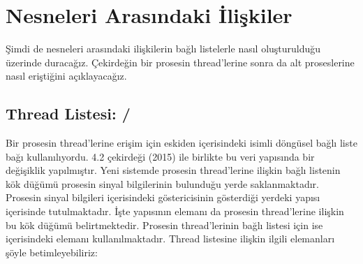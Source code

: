 \documentclass[a4paper,10pt,turkish]{sphinxmanual}
\begin{document}
\section{ Nesneleri Arasındaki İlişkiler}
\label{\detokenize{processcontrolblock:task-struct-nesneleri-arasindaki-iliskiler}}
\sphinxAtStartPar
Şimdi de  nesneleri arasındaki ilişkilerin bağlı listelerle nasıl oluşturulduğu üzerinde
duracağız. Çekirdeğin bir prosesin thread’lerine sonra da alt proseslerine nasıl eriştiğini açıklayacağız.


\subsection{Thread Listesi:  / }
\label{\detokenize{processcontrolblock:thread-listesi-thread-head-thread-node}}
\sphinxAtStartPar
Bir prosesin thread’lerine erişim için eskiden  içerisindeki  isimli
döngüsel bağlı liste bağı kullanılıyordu. 4.2 çekirdeği (2015) ile birlikte bu veri yapısında bir
değişiklik yapılmıştır. Yeni sistemde prosesin thread’lerine ilişkin bağlı listenin kök düğümü prosesin
sinyal bilgilerinin bulunduğu yerde saklanmaktadır. Prosesin sinyal bilgileri  içerisindeki
 göstericisinin gösterdiği yerdeki  yapısı içerisinde tutulmaktadır. İşte
 yapısının  elemanı da prosesin thread’lerine ilişkin bu kök düğümü
belirtmektedir. Prosesin thread’lerinin bağlı listesi için ise  içerisindeki 
elemanı kullanılmaktadır. Thread listesine ilişkin ilgili elemanları şöyle betimleyebiliriz:

\begin{sphinxVerbatim}[commandchars=\\\{\}]

\end{sphinxVerbatim}
\end{document}
